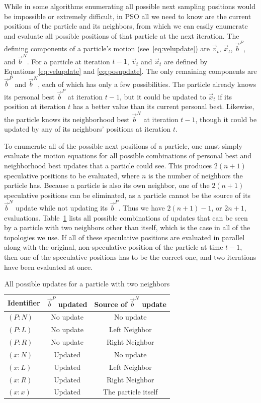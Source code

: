 \documentclass[journal,letterpaper]{IEEEtran}
\providecommand{\pers}{\ensuremath{P}}
\providecommand{\neigh}{\ensuremath{N}}
\providecommand{\leftind}{\ensuremath{L}}
\providecommand{\rightind}{\ensuremath{R}}
\providecommand{\ppos}{\ensuremath{\Vec{x}}}
\providecommand{\pvel}{\ensuremath{\Vec{v}}}
\providecommand{\nbest}{\ensuremath{\Vec{b}^\neigh}}
\providecommand{\pbest}{\ensuremath{\Vec{b}^\pers}}
\providecommand{\casexn}{\ensuremath{(x:\neigh)}}
\providecommand{\casexx}{\ensuremath{(x:x)}}
\providecommand{\casexl}{\ensuremath{(x:\leftind)}}
\providecommand{\casexr}{\ensuremath{(x:\rightind)}}
\providecommand{\casepn}{\ensuremath{(\pers:\neigh)}}
\providecommand{\casepl}{\ensuremath{(\pers:\leftind)}}
\providecommand{\casepr}{\ensuremath{(\pers:\rightind)}}
\begin{document}
While in some algorithms enumerating all possible next sampling positions would
be impossible or extremely difficult, in PSO all we need to know are the
current positions of the particle and its neighbors, from which we can easily
enumerate and evaluate all possible positions of that particle at the next
iteration.  The defining components of a particle's motion
(see~\eqref{eq:velupdate}) are $\pvel_t$, $\ppos_t$, $\pbest$, and $\nbest$.
For a particle at iteration $t-1$, $\pvel_t$ and $\ppos_t$ are defined by
Equations~\eqref{eq:velupdate} and \eqref{eq:posupdate}.  The only remaining
components are $\pbest$ and $\nbest$, each of which has only a few
possibilities.  The particle already knows its personal best $\pbest$ at
iteration $t-1$, but it could be updated to $\ppos_t$ if its position at
iteration $t$ has a better value than its current personal best.  Likewise, the
particle knows its neighborhood best $\nbest$ at iteration $t-1$, though it
could be updated by any of its neighbors' positions at iteration $t$.

To enumerate all of the possible next positions of a particle, one must simply
evaluate the motion equations for all possible combinations of personal best
and neighborhood best updates that a particle could see.  This produces
$2(n+1)$ speculative positions to be evaluated, where $n$ is the number of
neighbors the particle has.  Because a particle is also its own neighbor, one
of the $2(n+1)$ speculative positions can be eliminated, as a particle cannot
be the source of its $\nbest$ update while not updating its $\pbest$.  Thus we
have $2(n+1)-1$, or $2n+1$, evaluations.  Table~\ref{tab:evals} lists all
possible combinations of updates that can be seen by a particle with two
neighbors other than itself, which is the case in all of the topologies we use.
If all of these speculative positions are evaluated in parallel along with the
original, non-speculative position of the particle at time $t-1$, then one of
the speculative positions has to be the correct one, and two iterations have
been evaluated at once.

\begin{table}
  \caption{All possible updates for a particle with two neighbors}
  \label{tab:evals}
  \centering
  \begin{tabular}{lcc}
	Identifier&$\pbest$ updated&Source of $\nbest$ update\\
	\hline
	\hline
	$\casepn$&No update&No update\\
	\hline
	$\casepl$&No update&Left Neighbor\\
	\hline
	$\casepr$&No update&Right Neighbor\\
	\hline
	$\casexn$&Updated&No update\\
	\hline
	$\casexl$&Updated&Left Neighbor\\
	\hline
	$\casexr$&Updated&Right Neighbor\\
	\hline
	$\casexx$&Updated&The particle itself\\
	\hline
  \end{tabular}
\end{table}
\end{document}

